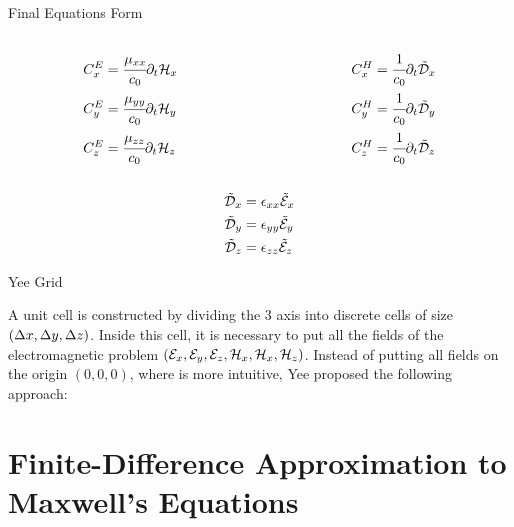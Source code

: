 \documentclass[aspectratio=169]{beamer}
\begin{document}
\begin{frame}{Final Equations Form}
  \begin{columns}
    \begin{column}{0.45\textwidth}
      \begin{align}
        C_x^E &= \cfrac{\mu_{xx}}{c_0} \partial_t \mathcal{H}_x \\
        C_y^E &= \cfrac{\mu_{yy}}{c_0} \partial_t \mathcal{H}_y\\
        C_z^E &= \cfrac{\mu_{zz}}{c_0} \partial_t \mathcal{H}_z
    \end{align}
    \end{column}
    \begin{column}{0.45\textwidth}
      \begin{align}
        C_x^H &= \cfrac{1}{c_0} \partial_t \tilde{\mathcal{D}}_x \\
        C_y^H &= \cfrac{1}{c_0} \partial_t \tilde{\mathcal{D}}_y \\
        C_z^H &= \cfrac{1}{c_0} \partial_t \tilde{\mathcal{D}}_z
    \end{align}
    \end{column}

  \end{columns}

  \begin{align}
    \tilde{\mathcal{D}}_x &= \epsilon_{xx} \tilde{\mathcal{E}}_x \label{eq:dnx_update} \\
    \tilde{\mathcal{D}}_y &= \epsilon_{yy} \tilde{\mathcal{E}}_y \label{eq:dny_update} \\
    \tilde{\mathcal{D}}_z &= \epsilon_{zz} \tilde{\mathcal{E}}_z \label{eq:dnz_update}
\end{align}
\end{frame}

\begin{frame}{Yee Grid}
  
A unit cell is constructed by dividing the 3 axis into discrete cells of size $(\Delta x, \Delta y, \Delta z)$. Inside this cell, it is necessary to put all the fields of the electromagnetic problem $(\mathcal{E}_x, \mathcal{E}_y, \mathcal{E}_z, \mathcal{H}_x, \mathcal{H}_x, \mathcal{H}_z)$. Instead of putting all fields on the origin $(0, 0, 0)$, where is more intuitive, Yee proposed the following approach:

\centering


\end{frame}

\section{Finite-Difference Approximation to Maxwell's Equations}
\end{document}
